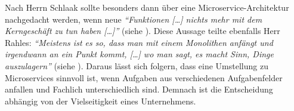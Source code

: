 Nach Herrn Schlaak sollte besonders dann über eine Microservice-Architektur nachgedacht werden, wenn neue \textit{\enquote{Funktionen […] nichts mehr mit dem Kerngeschäft zu tun haben […]}} (siehe ). Diese Aussage teilte ebenfalls Herr Rahles: \textit{\enquote{Meistens ist es so, dass man mit einem Monolithen anfängt und irgendwann an ein Punkt kommt, […] wo man sagt, es macht Sinn, Dinge auszulagern}} (siehe ). Daraus lässt sich folgern, dass eine Umstellung zu Microservices sinnvoll ist, wenn Aufgaben aus verschiedenen Aufgabenfelder anfallen und Fachlich unterschiedlich sind. Demnach ist die Entscheidung abhängig von der Vielseitigkeit eines Unternehmens.